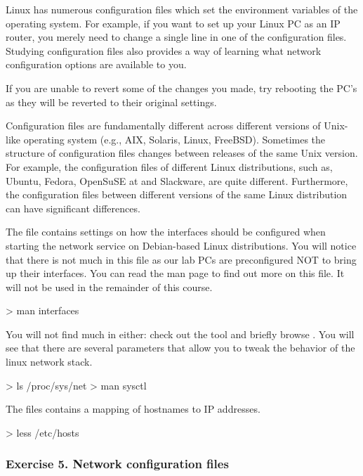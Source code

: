 Linux has numerous configuration files which set the environment variables of the operating system. For example, if you want to set up your Linux PC as an IP router, you merely need to change a single line in one of the configuration files. Studying configuration files also provides a way of learning what network configuration options are available to you.

\remark If you are unable to revert some of the changes you made, try rebooting the PC's as they will be reverted to their original settings.

\remark Configuration files are fundamentally different across different versions of Unix-like operating system (e.g., AIX, Solaris, Linux, FreeBSD). Sometimes the structure of configuration files changes between releases of the same Unix version. For example, the configuration files of different Linux distributions, such as, Ubuntu, Fedora, OpenSuSE at and Slackware, are quite different. Furthermore, the configuration files between different versions of the same Linux distribution can have significant differences.

The file  contains settings on how the interfaces should be configured when starting the network service on Debian-based Linux distributions. You will notice that there is not much in this file as our lab PCs are preconfigured NOT to bring up their interfaces. You can read the man page to find out more on this file. It will not be used in the remainder of this course.

\begin{cmdblock}
	> man interfaces
\end{cmdblock}

You will not find much in  either: check out the  tool and briefly browse . You will see that there are several parameters that allow you to tweak the behavior of the linux network stack.

\begin{cmdblock}
	> ls /proc/sys/net
	> man sysctl
\end{cmdblock}

The  files contains a mapping of hostnames to IP addresses.

\begin{cmdblock}
	> less /etc/hosts
\end{cmdblock}

\subsubsection*{Exercise 5. Network configuration files}
\begin{questions}

\end{questions}

